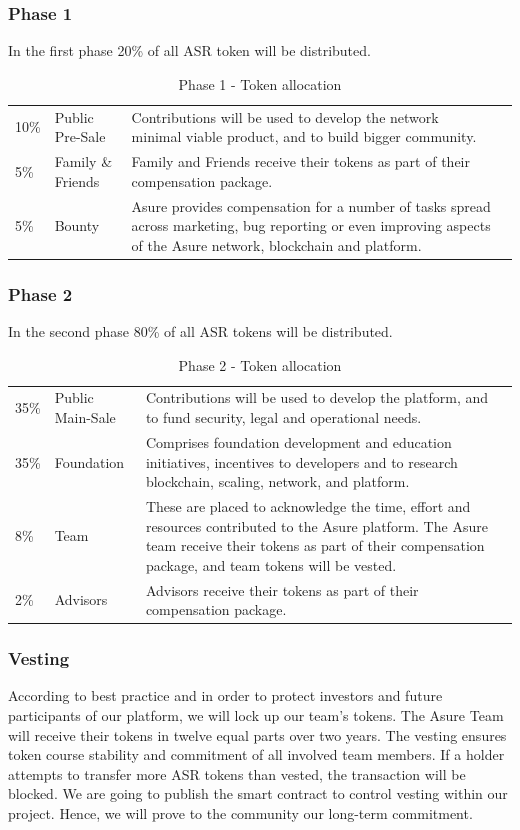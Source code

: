 \subsubsection{Phase 1}

In the first phase 20\% of all ASR token will be distributed.

\begin{table}[H]
\begin{tabular}{llp{}l}
  10\% & Public Pre-Sale & Contributions will be used to develop the network minimal viable product, and to build bigger community.\\
  5\% & Family \& Friends & Family and Friends receive their tokens as part of their compensation package.\\
  5\% & Bounty & Asure provides compensation for a number of tasks spread across marketing, bug reporting or even improving aspects of the Asure network, blockchain and platform.
\end{tabular}
\caption{\label{tab:table-name} Phase 1 - Token allocation}
\end{table}

\subsubsection{Phase 2}

In the second phase 80\% of all ASR tokens will be distributed.

\begin{table}[H]
\begin{tabular}{llp{}l}
  35\% & Public Main-Sale & Contributions will be used to develop the platform, and to fund security, legal and operational needs. \\
  35\% & Foundation & Comprises foundation development and education initiatives, incentives to developers and to research blockchain, scaling, network, and platform.\\
  8\% & Team  & These are placed to acknowledge the time, effort and resources contributed to the Asure platform.  The Asure team receive their tokens as part of their compensation package, and team tokens will be vested.\\
  2\% & Advisors & Advisors receive their tokens as part of their compensation package.
\end{tabular}
\caption{\label{tab:table-name} Phase 2 - Token allocation}
\end{table}

\subsubsection{Vesting}
According to best practice and in order to protect investors and future participants of our platform, we will lock up our team’s tokens. The Asure Team will receive their tokens in twelve equal parts over two years.
The vesting ensures token course stability and commitment of all involved team members. If a holder attempts to transfer more ASR tokens than vested, the transaction will be blocked.
We are going to publish the smart contract to control vesting within our project. Hence, we will prove to the community our long-term commitment. 

